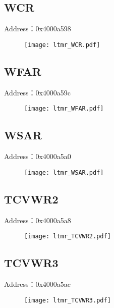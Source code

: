\subsection{WCR}
\label{ltmr-WCR}
Address：0x4000a598
 \begin{figure}[H]
\texttt{[image: ltmr\_WCR.pdf]}
\end{figure}

\subsection{WFAR}
\label{ltmr-WFAR}
Address：0x4000a59c
 \begin{figure}[H]
\texttt{[image: ltmr\_WFAR.pdf]}
\end{figure}

\subsection{WSAR}
\label{ltmr-WSAR}
Address：0x4000a5a0
 \begin{figure}[H]
\texttt{[image: ltmr\_WSAR.pdf]}
\end{figure}

\subsection{TCVWR2}
\label{ltmr-TCVWR2}
Address：0x4000a5a8
 \begin{figure}[H]
\texttt{[image: ltmr\_TCVWR2.pdf]}
\end{figure}

\subsection{TCVWR3}
\label{ltmr-TCVWR3}
Address：0x4000a5ac
 \begin{figure}[H]
\texttt{[image: ltmr\_TCVWR3.pdf]}
\end{figure}

